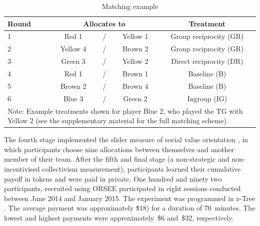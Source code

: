\documentclass[12pt,a4paper]{article}\usepackage[]{graphicx}\usepackage[]{color}
\begin{document}
\begin{table}
  \caption{Matching example}\label{tab:example}
  \begin{center}
    \begin{tabular}{lcccc}
    \toprule
    Round	&	\multicolumn{3}{c}{Allocates to}		&	Treatment	\\
    \midrule
    1	&	\color{red}Red 1	&	/	&	\color{yellow!80!black}Yellow 1	&	Group reciprocity (GR)	\\
    2	&	\color{yellow!80!black}Yellow 4	&	/	&	\color{brown}Brown 2	&	Group reciprocity (GR)	\\
    3	&	\color{green!60!black}Green 3	&	/	&	\color{yellow!80!black}Yellow 2	&	Direct reciprocity (DR)	\\
    4	&	\color{red}Red 1	&	/	&	\color{brown}Brown 1	&	Baseline (B)	\\
    5	&	\color{brown}Brown 2	&	/	&	\color{brown}Brown 4	&	Baseline (B)	\\
    6	&	\color{blue}Blue 3	&	/	&	\color{green!60!black}Green 2	&	Ingroup (IG)	\\
    \bottomrule
    \multicolumn{5}{p{0.7\textwidth}}{\footnotesize
	Note: Example treatments shown for player {\color{blue}Blue 2}, who played the TG with {\color{yellow!80!black}Yellow 2} (see the supplementary material for the full matching scheme).    
    }
    \end{tabular}
  \end{center}
\end{table}

The fourth stage implemented the slider measure of social value orientation
\citep*{murphy2011measuring,crosetto2012flexible}, in which participants
choose nine allocations between themselves and another member of their team.
After the fifth and final stage (a non-strategic and non-incentivised
collectivism measurement), participants learned their cumulative payoff in tokens and were paid in private.
One hundred and ninety two participants, recruited using ORSEE \citep*{greiner2015subject} participated in eight sessions conducted between June 2014 and January
2015. %
The experiment was programmed in z-Tree \citep*{Fischbacher2007}. 
The average payment was approximately \$18) for a duration of 70~minutes. The lowest and highest payments were approximately~\$6 and~\$32, respectively.
\end{document}
